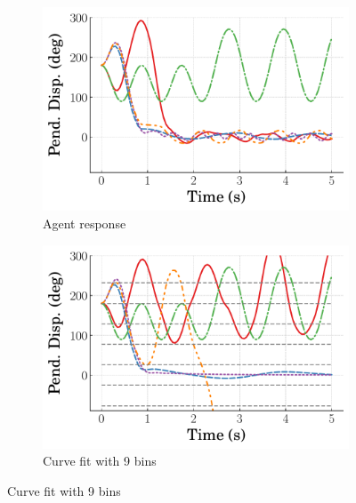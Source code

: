 %
\begin{figure}
    \centering
    \begin{subfigure}[b]{0.32\textwidth}
        \centering
        \includegraphics[width=\textwidth]{figures/figures_Interpretability/Mean_ISE_Inverted_Pendulum-v0_cubic_9_bins/Curve_fit_time_responses/lumped_lqr/agent_Pend_Disp_180.pdf}
        \caption{Agent response}
        \label{subfig_chap5:RL_LQR_180_init_agent}
    \end{subfigure}
    \hfill
    \begin{subfigure}[b]{0.32\textwidth}
        \centering
        \includegraphics[width=\textwidth]{figures/figures_Interpretability/Mean_ISE_Inverted_Pendulum-v0_cubic_9_bins/Curve_fit_time_responses/lumped_lqr/curve_fit_Pend_Disp_180.pdf}
        \caption{Curve fit with 9 bins}
        \label{subfig_chap5:RL_LQR_180_init_curve_fit_9_bins_unclipped}
    \end{subfigure}

\end{figure}
